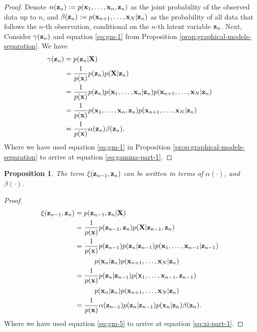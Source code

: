 \documentclass[11pt]{article}
\numberwithin{equation}{section}
\newcommand{\x}{{\bf x}}
\newcommand{\X}{{\bf X}}
\newcommand{\z}{{\bf z}}
\newtheorem{proposition}{Proposition}[section]
\begin{document}
\begin{proof}
Denote $\alpha(\z_n) := p(\x_1, \ldots, \x_n, \z_n)$ as the joint probability of the observed data up to $n$, and $\beta(\z_n) := p(\x_{n+1}, \ldots, \x_N\vert \z_n)$ as the probability of all data that follows the $n$-th observation, conditional on the $n$-th latent variable $\z_n$. Next, Consider  $\gamma(\z_n)$ and equation \eqref{eq:gm-1} from Proposition \ref{prop:graphical-models-separation}. We have
\begin{align}
	\gamma(\z_n) &= p(\z_n \vert {\bf X})\\
					  &= \frac{1}{p(\x)}p(\z_n)p({\bf X} \vert \z_n)\\
					  &= \frac{1}{p(\x)} p(\z_n) p(\x_1, \ldots, \x_n\vert \z_n) p(\x_{n+1}, \ldots, \x_N\vert \z_n) \label{eq:gamma-part-1}\\
					  &= \frac{1}{p(\x)}p(\x_1, \ldots, \x_n, \z_n) p(\x_{n+1}, \ldots, \x_N\vert \z_n)\\
					  &= \frac{1}{p(\x)}\alpha(\z_n)\beta(\z_n).
\end{align}
Where we have used equation \eqref{eq:gm-1} in Proposition \ref{prop:graphical-models-separation} to arrive at equation \eqref{eq:gamma-part-1}.
\end{proof}


\begin{proposition}\label{prop:xi-factorisation}
	The term $\xi(\z_{n-1}, \z_n)$ can be written in terms of $\alpha({\cdot})$, and $\beta(\cdot)$.
\end{proposition}

\begin{proof}
	\begin{align}
		\xi(\z_{n-1}, \z_{n}) &= p(\z_{n-1}, \z_{n} \vert \X)\\
		&= \frac{1}{p(\x)}p(\z_{n-1}, \z_{n}) p(\X \vert \z_{n-1}, \z_{n})\\
		&= \frac{1}{p(\x)} p(\z_{n-1}) p(\z_{n} \vert \z_{n-1}) p(\x_1, \ldots, \x_{n-1}\vert \z_{n-1}) \nonumber \\
			&\hspace{1cm} p(\x_n\vert \z_n) p(\x_{n+1}, \ldots, \x_N \vert \z_n) \label{eq:xi-part-1}\\
		&= \frac{1}{p(\x)} p(\z_{n} \vert \z_{n-1}) p(\x_1, \ldots, \x_{n-1}, \z_{n-1}) \nonumber \\
			&\hspace{1cm} p(\x_n\vert \z_n) p(\x_{n+1}, \ldots, \x_N \vert \z_n)\\
		&= \frac{1}{p(\x)} \alpha(\z_{n-1}) p(\z_{n} \vert \z_{n-1}) p(\x_n \vert \z_n) \beta(\z_n).
	\end{align}
Where we have used equation \eqref{eq:gm-5} to arrive at equation \eqref{eq:xi-part-1}.
\end{proof}
\end{document}
